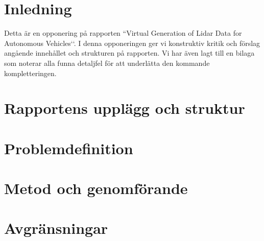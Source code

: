 \documentclass[12pt,a4paper,twoside,openright]{report}
\begin{document}
 


\newcommand{\varHeadline}{Opponering av DATX02-17-10}
\newcommand{\varSubtitle}{Av DATX02-17-12}
\newcommand{\varDepartment}{Department of Computer Science and Engineering}
\newcommand{\varNames}{André Perzon, Björn Strömberg, Chi Thong Luong,  \\
Elias Forsberg, Jesper Åberg, Jon Johnsson}




\section{Inledning}

Detta är en opponering på rapporten ``Virtual Generation of Lidar Data for
Autonomous Vehicles‘‘. I denna opponeringen ger vi konstruktiv kritik och förslag angående innehållet och strukturen på rapporten. Vi har även lagt till en bilaga som noterar alla funna detaljfel för att underlätta den kommande kompletteringen.

\section{Rapportens upplägg och struktur}

\section{Problemdefinition}

\section{Metod och genomförande}

\section{Avgränsningar}
\end{document}
